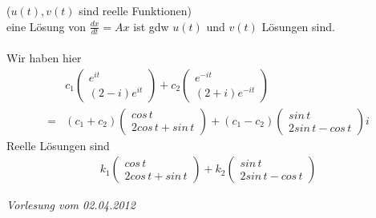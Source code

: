 ($u(t), v(t)$ sind reelle Funktionen) \\
eine Lösung von $\frac{dx}{dt} = Ax$ ist gdw $u(t)$ und $v(t)$ Lösungen sind.\\\\
Wir haben hier
\begin{align}
&c_1 \begin{pmatrix} e^{it} \\ (2-i) e^{it}\end{pmatrix} + c_2 \begin{pmatrix} e^{-it} \\ (2+i) e^{-it}\end{pmatrix} \\
= &(c_1 + c_2) \begin{pmatrix} cos\, t \\ 2 cos\, t + sin\, t\end{pmatrix} + (c_1 - c_2) \begin{pmatrix} sin\, t \\ 2 sin\, t - cos\, t\end{pmatrix} i
\end{align}
Reelle Lösungen sind
\begin{align}
k_1 \begin{pmatrix} cos\, t \\ 2 cos\, t + sin\, t\end{pmatrix} + k_2 \begin{pmatrix} sin\, t \\ 2 sin\, t - cos\, t\end{pmatrix}
\end{align}

\newpage
\noindent \textit{Vorlesung vom 02.04.2012} \\
